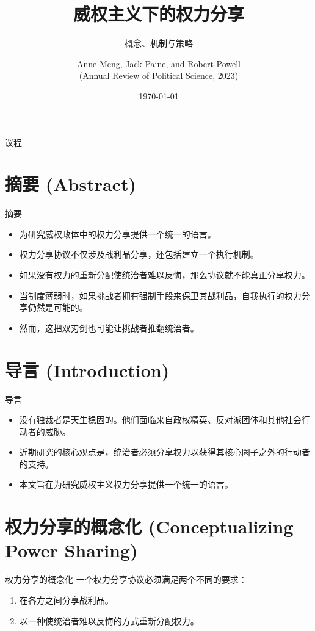 \documentclass[aspectratio=169]{ctexbeamer}
\title{威权主义下的权力分享}
\subtitle{概念、机制与策略}
\author{\small Anne Meng, Jack Paine, and Robert Powell \\ (Annual Review of Political Science, 2023)}
\date{\today}
\institute{摘要与翻译}
\begin{document}
\begin{frame}
  \titlepage
\end{frame}

\begin{frame}{议程}
  \tableofcontents
\end{frame}

\section{摘要 (Abstract)}
\begin{frame}{摘要}
  \begin{itemize}
    \item 为研究威权政体中的权力分享提供一个统一的语言。
    \item 权力分享协议不仅涉及战利品分享，还包括建立一个执行机制。
    \item 如果没有权力的重新分配使统治者难以反悔，那么协议就不能真正分享权力。
    \item 当制度薄弱时，如果挑战者拥有强制手段来保卫其战利品，自我执行的权力分享仍然是可能的。
    \item 然而，这把双刃剑也可能让挑战者推翻统治者。
  \end{itemize}
\end{frame}

\section{导言 (Introduction)}
\begin{frame}{导言}
  \begin{itemize}
    \item 没有独裁者是天生稳固的。他们面临来自政权精英、反对派团体和其他社会行动者的威胁。
    \item 近期研究的核心观点是，统治者必须分享权力以获得其核心圈子之外的行动者的支持。
    \item 本文旨在为研究威权主义权力分享提供一个统一的语言。
  \end{itemize}
\end{frame}

\section{权力分享的概念化 (Conceptualizing Power Sharing)}
\begin{frame}{权力分享的概念化}
  一个权力分享协议必须满足两个不同的要求：
  \begin{enumerate}
    \item<1-> 在各方之间分享战利品。
    \item<2-> 以一种使统治者难以反悔的方式重新分配权力。
  \end{enumerate}
  \vspace{1cm}
\end{frame}
\end{document}
